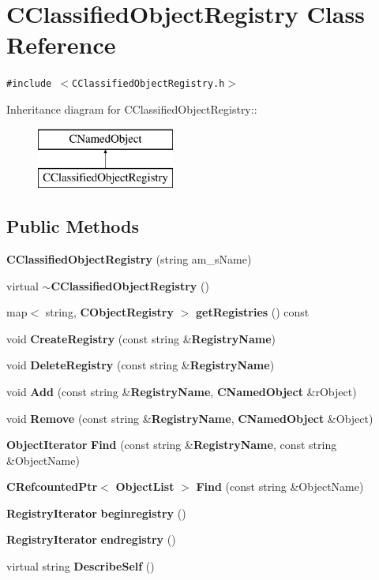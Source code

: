 \section{CClassified\-Object\-Registry  Class Reference}
\label{classCClassifiedObjectRegistry}
{\tt \#include $<$CClassified\-Object\-Registry.h$>$}

Inheritance diagram for CClassified\-Object\-Registry::\begin{figure}[H]
\begin{center}
\leavevmode
\includegraphics[height=2cm]{classCClassifiedObjectRegistry}
\end{center}
\end{figure}
\subsection*{Public Methods}
\begin{CompactItemize}
\item 
{\bf CClassified\-Object\-Registry} (string am\_\-s\-Name)
\item 
virtual {\bf $\sim$CClassified\-Object\-Registry} ()
\item 
map$<$ string, {\bf CObject\-Registry} $>$ {\bf get\-Registries} () const
\item 
void {\bf Create\-Registry} (const string \&{\bf Registry\-Name})
\item 
void {\bf Delete\-Registry} (const string \&{\bf Registry\-Name})
\item 
void {\bf Add} (const string \&{\bf Registry\-Name}, {\bf CNamed\-Object} \&r\-Object)
\item 
void {\bf Remove} (const string \&{\bf Registry\-Name}, {\bf CNamed\-Object} \&Object)
\item 
{\bf Object\-Iterator} {\bf Find} (const string \&{\bf Registry\-Name}, const string \&Object\-Name)
\item 
{\bf CRefcounted\-Ptr}$<$ {\bf Object\-List} $>$ {\bf Find} (const string \&Object\-Name)
\item 
{\bf Registry\-Iterator} {\bf beginregistry} ()
\item 
{\bf Registry\-Iterator} {\bf endregistry} ()
\item 
virtual string {\bf Describe\-Self} ()
\end{CompactItemize}
